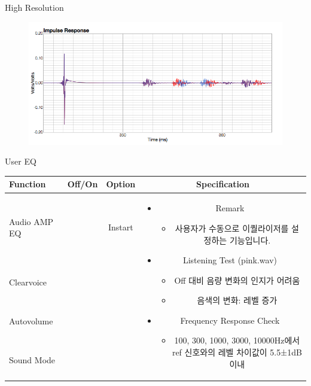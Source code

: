 \documentclass{beamer}
\begin{document}
\begin{frame}[t]{High Resolution}
		\begin{figure}[b]
			\includegraphics[height=0.32\textwidth]{figure/highresolution.png}
		\end{figure}
		
	\end{frame}
	
	
	\begin{frame}[t]{User EQ}
		\begin{tiny}
			\begin{tabular}{@{}lccc@{}}
				\toprule
				Function & Off/On & Option & Specification \\
				\midrule
				Audio AMP EQ & \color{black}{Off} & Instart &
				\multirow{14}{60mm}{
					\begin{itemize}
						\item Remark
						\begin{itemize}
							\item 사용자가 수동으로 이퀄라이저를 설정하는 기능입니다.
						\end{itemize}
						\item Listening Test (pink.wav)
						\begin{itemize}
							\item Off 대비 음량 변화의 인지가 어려움
							\item 음색의 변화: 레벨 증가
						\end{itemize}
						\item Frequency Response Check
						\begin{itemize}
							\item 100, 300, 1000, 3000, 10000Hz에서 ref 신호와의 레벨 차이값이 5.5±1dB 이내
						\end{itemize}
					\end{itemize}
				} \\
				Clearvoice & \color{black}{Off} & & \\
				Autovolume & \color{black}{Off} & & \\
				Sound Mode & \color{black}{Off} & & \\

\end{tabular}
\end{tiny}
\end{frame}
\end{document}
